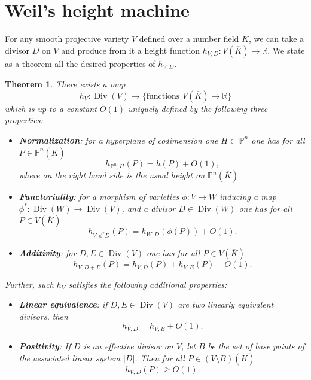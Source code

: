 \documentclass{article}
\newtheorem{theorem}[proposition]{Theorem}
\theoremstyle{definition}
\DeclareMathOperator{\Div}{Div}
\newcommand{\term}{\textbf}
\newcommand{\RR}{\mathbb{R}}
\newcommand{\PP}{\mathbb{P}}
\begin{document}
\section{Weil's height machine}

For any smooth projective variety $V$ defined over a number field $K$, we can
take a divisor $D$ on $V$ and produce from it a height function
$h_{V,D}\colon V (\overline{K}) \to \RR$. We state as a theorem all the desired
properties of $h_{V,D}$.

\begin{theorem}
  \label{theorem:weil-height-machine}
  There exists a map
  $$h_V\colon \Div (V) \to \{ \text{functions } V (\overline{K}) \to \RR \}$$
  which is up to a constant $O (1)$ uniquely defined by the following three
  properties:
  \begin{itemize}
  \item \term{Normalization}: for a hyperplane of codimension one
    $H \subset \PP^n$ one has for all $P\in \PP^n (\overline{K})$
    $$h_{\PP^n,H} (P) = h(P) + O (1),$$
    where on the right hand side is the usual height on $\PP^n (\overline{K})$.

  \item \term{Functoriality}: for a morphism of varieties $\phi\colon V\to W$
    inducing a map $\phi^*\colon \Div (W)\to \Div(V)$, and a divisor
    $D \in \Div (W)$ one has for all $P\in V(\overline{K})$
    $$h_{V,\phi^* D} (P) = h_{W,D} (\phi (P)) + O (1).$$

  \item \term{Additivity}: for $D,E\in \Div (V)$ one has for all
    $P\in V(\overline{K})$
    $$h_{V, D+E} (P) = h_{V,D} (P) + h_{V,E} (P) + O (1).$$
  \end{itemize}

  Further, such $h_V$ satisfies the following additional properties:
  \begin{itemize}
  \item \term{Linear equivalence}: if $D,E \in \Div (V)$ are two linearly
    equivalent divisors, then
    $$h_{V,D} = h_{V,E} + O (1).$$

  \item \term{Positivity}: If $D$ is an effective divisor on $V$, let $B$ be the
    set of base points of the associated linear system $|D|$. Then for all
    $P \in (V\setminus B) (\overline{K})$
    $$h_{V,D} (P) \ge O (1).$$



\end{itemize}
\end{theorem}
\end{document}

